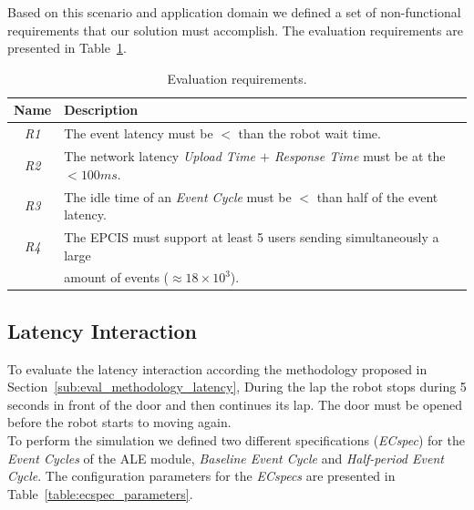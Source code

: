 Based on this scenario and application domain we defined a set of non-functional requirements that
our solution must accomplish. The evaluation requirements are presented in Table~\ref{table:eval_requirements}.\\

\begin{table}[ht!]
  \begin{tabular}{|c|l|}
    \hline
    Name          & Description                                                                                                         \\ \hline
    \textit{R1}   & The event latency must be $<$ than the robot wait time.                                                             \\ \hline
    \textit{R2}   & The network latency \textit{Upload Time $+$ Response Time} must be at the $< 100ms$.                                \\ \hline
    \textit{R3}   & The idle time of an \textit{Event Cycle} must be $<$ than half of the event latency.                                \\ \hline
    \textit{R4}   & The EPCIS must support at least 5 users sending simultaneously a large                                                       \\
    ~             & amount of events ($\approx18\times10^{3}$).                                                                 \\ \hline
  \end{tabular}
  \caption{Evaluation requirements.}
  \label{table:eval_requirements}
\end{table}

\subsection{Latency Interaction}
\label{sub:eval_exp_latency}
To evaluate the latency interaction according the methodology proposed in Section~\ref{sub:eval_methodology_latency},
During the lap the robot stops during 5 seconds in front of the door and then continues its lap.
The door must be opened before the robot starts to moving again.\\

To perform the simulation we defined two different specifications (\textit{ECspec}) for the
\textit{Event Cycles} of the \gls{ALE} module, \textit{Baseline Event Cycle} and
\textit{Half-period Event Cycle}. The configuration parameters for the \textit{ECspecs} are presented
in Table~\ref{table:ecspec_parameters}.\\

